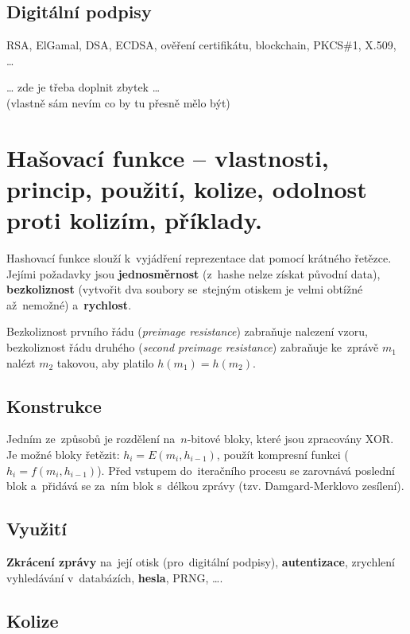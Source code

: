\subsection{Digitální podpisy}

RSA, ElGamal, DSA, ECDSA, ověření certifikátu, blockchain, PKCS\#1, X.509, \dots

\begin{center}
{\huge \dots} zde je třeba doplnit zbytek {\huge \dots} \\
(vlastně sám nevím co by tu přesně mělo být)
\end{center}

\clearpage
\section{Hašovací funkce -- vlastnosti, princip, použití, kolize, odolnost proti kolizím, příklady.}

Hashovací funkce slouží k~vyjádření reprezentace dat pomocí krátného řetězce. Jejími požadavky jsou \textbf{jednosměrnost} (z~hashe nelze získat původní data), \textbf{bezkoliznost} (vytvořit dva soubory se~stejným otiskem je velmi obtížné až~nemožné) a~\textbf{rychlost}.

Bezkoliznost prvního řádu (\emph{preimage resistance}) zabraňuje nalezení vzoru, bezkoliznost řádu druhého (\emph{second preimage resistance}) zabraňuje ke~zprávě $m_1$ nalézt $m_2$ takovou, aby platilo $h(m_1) = h(m_2)$.

\subsection{Konstrukce}

Jedním ze~způsobů je rozdělení na~$n$-bitové bloky, které jsou zpracovány XOR. Je možné bloky řetězit: $h_i = E(m_i, h_{i-1})$, použít kompresní funkci ($h_i = f(m_i, h_{i-1})$). Před vstupem do~iteračního procesu se zarovnává poslední blok a~přidává se za~ním blok s~délkou zprávy (tzv. Damgard-Merklovo zesílení).

\subsection{Využití}

\textbf{Zkrácení zprávy} na~její otisk (pro~digitální podpisy), \textbf{autentizace}, zrychlení vyhledávání v~databázích, \textbf{hesla}, PRNG, \dots.


\subsection{Kolize}

